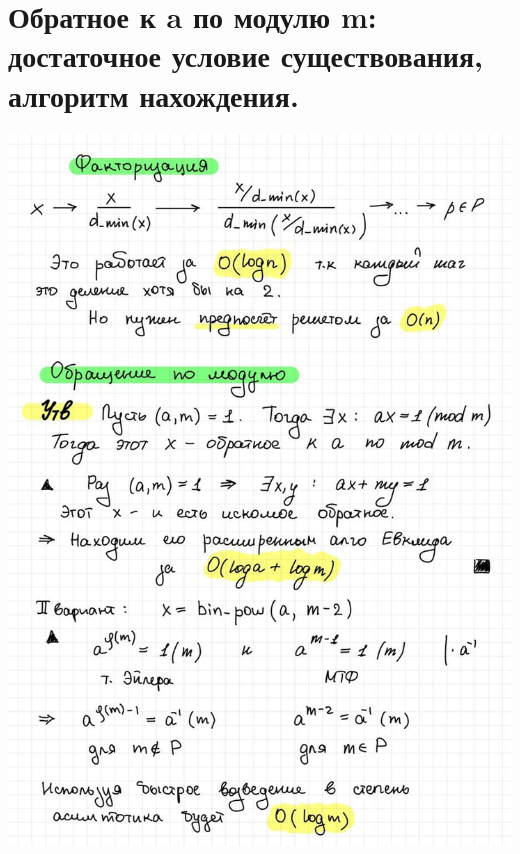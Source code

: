 \section{Обратное к a по модулю m: достаточное условие существования, алгоритм нахождения.}
\includegraphics[width=1\linewidth]{images/mod_m.jpg}